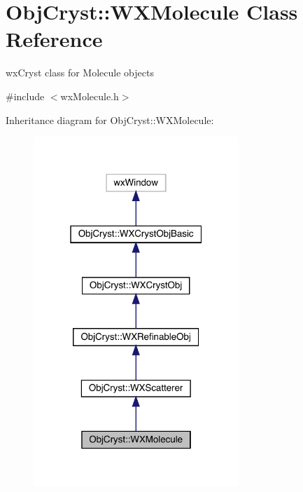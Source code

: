 \hypertarget{class_obj_cryst_1_1_w_x_molecule}{}\section{Obj\+Cryst\+::W\+X\+Molecule Class Reference}
\label{class_obj_cryst_1_1_w_x_molecule}


wx\+Cryst class for Molecule objects  




{\ttfamily \#include $<$wx\+Molecule.\+h$>$}



Inheritance diagram for Obj\+Cryst\+::W\+X\+Molecule\+:
\nopagebreak
\begin{figure}[H]
\begin{center}
\leavevmode
\includegraphics[width=220pt]{class_obj_cryst_1_1_w_x_molecule__inherit__graph}
\end{center}
\end{figure}


